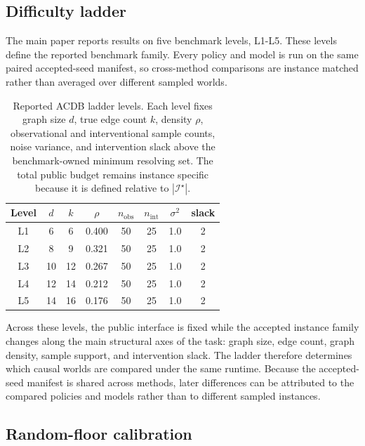 \FloatBarrier

\subsection{Difficulty ladder}

The main paper reports results on five benchmark levels, L1-L5. These levels define the reported benchmark family. Every policy and model is run on the same paired accepted-seed manifest, so cross-method comparisons are instance matched rather than averaged over different sampled worlds.

\begin{table}[t]
\centering
\caption{Reported ACDB ladder levels. Each level fixes graph size $d$, true edge count $k$, density $\rho$, observational and interventional sample counts, noise variance, and intervention slack above the benchmark-owned minimum resolving set. The total public budget remains instance specific because it is defined relative to $|\mathcal{I}^\star|$.}
\label{tab:ladder}
\begin{tabular}{cccccccc}
\toprule
Level & $d$ & $k$ & $\rho$ & $n_{\mathrm{obs}}$ & $n_{\mathrm{int}}$ & $\sigma^2$ & slack \\
\midrule
L1 & 6  & 6  & 0.400 & 50 & 25 & 1.0 & 2 \\
L2 & 8  & 9  & 0.321 & 50 & 25 & 1.0 & 2 \\
L3 & 10 & 12 & 0.267 & 50 & 25 & 1.0 & 2 \\
L4 & 12 & 14 & 0.212 & 50 & 25 & 1.0 & 2 \\
L5 & 14 & 16 & 0.176 & 50 & 25 & 1.0 & 2 \\
\bottomrule
\end{tabular}
\end{table}

Across these levels, the public interface is fixed while the accepted instance family changes along the main structural axes of the task: graph size, edge count, graph density, sample support, and intervention slack. The ladder therefore determines which causal worlds are compared under the same runtime. Because the accepted-seed manifest is shared across methods, later differences can be attributed to the compared policies and models rather than to different sampled instances.

\subsection{Random-floor calibration}
\label{sec:density}

